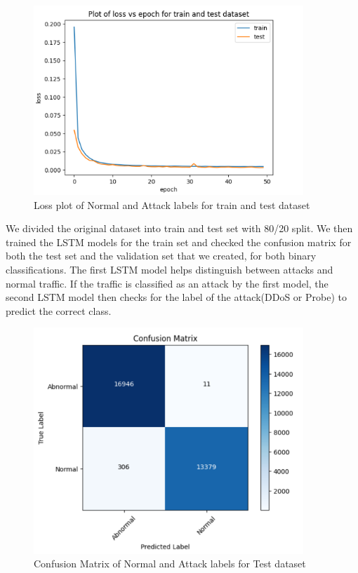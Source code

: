 \begin{figure}[tbh]
	\begin{center}
		\includegraphics[width=4in]{images/attloss.png} 
		\caption{Loss plot of Normal and Attack labels for train and test dataset} %
		\label{Loss plot for train and test dataset} %
	\end{center}
\end{figure}
We divided the original dataset into train and test set with 80/20 split. We then trained the LSTM models for the train set and checked the confusion matrix for both the test set and the validation set that we created, for both binary classifications. The first LSTM model helps distinguish between attacks and normal traffic. If the traffic is classified as an attack by the first model, the second LSTM model then checks for the label of the attack(DDoS or Probe) to predict the correct class.\par
 \begin{figure}[tbh] %
	\begin{center}
		\includegraphics[width=4in]{images/testmat.png} 
		\caption{Confusion Matrix of Normal and Attack labels for Test dataset} %
		\label{Confusion Matrix of Normal and Attack labels for Test dataset} 
	\end{center}
\end{figure}
